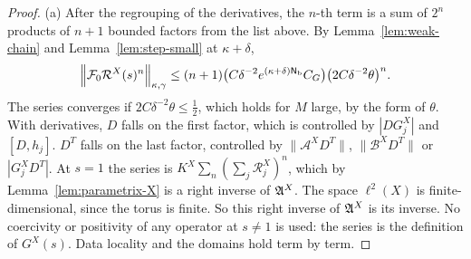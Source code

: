 \begin{proof}
(a) After the regrouping of the derivatives, the $n$-th term is a sum of $2^n$ products of $n+1$ bounded factors from the list above. By Lemma~\ref{lem:weak-chain} and Lemma~\ref{lem:step-small} at $\kappa+\delta$,
\[
\Big\|\mathcal F_0\mathcal R^X(s)^n\Big\|_{\kappa,\gamma}\le(n+1)\big(C\delta^{-2}e^{(\kappa+\delta)\mathsf N_{\rm b}}C_G\big)\big(2C\delta^{-2}\theta\big)^n .
\]
The series converges if $2C\delta^{-2}\theta\le\frac12$, which holds for $M$ large, by the form of $\theta$. With derivatives, $D$ falls on the first factor, which is controlled by $|DG^X_j|$ and $[D,h_j]$. $D^T$ falls on the last factor, controlled by $\|\mathcal A^XD^T\|$, $\|\mathcal B^XD^T\|$ or $|G^X_jD^T|$. At $s=1$ the series is $K^X\sum_n(\sum_j\mathcal R^X_j)^n$, which by Lemma~\ref{lem:parametrix-X} is a right inverse of $\mathfrak A^X$. The space $\ell^2(X)$ is finite-dimensional, since the torus is finite. So this right inverse of $\mathfrak A^X$ is its inverse. No coercivity or positivity of any operator at $s\ne1$ is used: the series is the definition of $G^X(s)$. Data locality and the domains hold term by term.


\end{proof}
